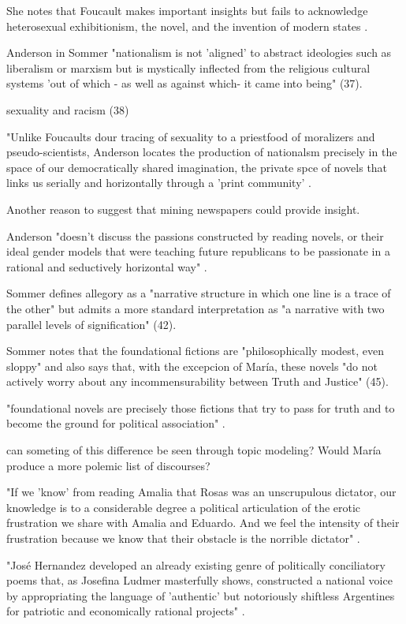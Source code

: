 She notes that Foucault makes important insights but fails to acknowledge heterosexual exhibitionism, the novel, and the invention of modern states \cite[37]{Sommer1991}.

Anderson in Sommer "nationalism is not 'aligned' to abstract ideologies such as liberalism or marxism but is mystically inflected from the religious cultural systems 'out of which - as well as against which- it came into being" (37).

sexuality and racism (38)

"Unlike Foucaults dour tracing of sexuality to a priestfood of moralizers and pseudo-scientists, Anderson locates the production of nationalsm precisely in the space of our democratically shared imagination, the private spce of novels that links us serially and horizontally through a 'print community' \cite[39]{Sommer1991}.
	
	Another reason to suggest that mining newspapers could provide insight.


Anderson "doesn't discuss the passions constructed by reading novels, or their ideal gender models that were teaching future republicans to be passionate in a rational and seductively horizontal way" \cite[40]{Sommer1991}.

Sommer defines allegory as a "narrative structure in which one line is a trace of the other" but admits a more standard interpretation as "a narrative with two parallel levels of signification" (42).

Sommer notes that the foundational fictions are "philosophically modest, even sloppy" and also says that, with the excepcion of María, these novels "do not actively worry about any incommensurability between Truth and Justice" (45).

"foundational novels are precisely those fictions that try to pass for truth and to become the ground for political association" \cite[45]{Sommer1991}.

	can someting of this difference be seen through topic modeling? Would María produce a more polemic list of discourses?

"If we 'know' from reading Amalia that Rosas was an unscrupulous dictator, our knowledge is to a considerable degree a political articulation of the erotic frustration we share with Amalia and Eduardo. And we feel the intensity of their frustration because we know that their obstacle is the norrible dictator" \cite[47]{Sommer1991}.


"José Hernandez developed an already existing genre of politically conciliatory poems that, as Josefina Ludmer masterfully shows, constructed a national voice by appropriating the language of 'authentic' but notoriously shiftless Argentines for patriotic and economically rational projects" \cite[111]{Sommer1991}.

